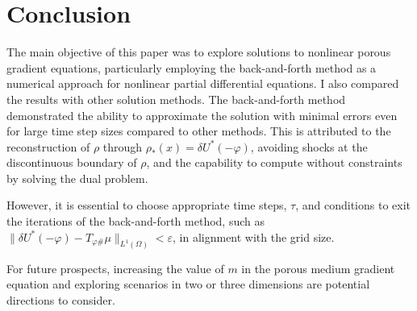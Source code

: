 \documentclass[a4,11pt, twocolumn, dvipdfmx]{article}
\theoremstyle{definition}
\begin{document}
\section{Conclusion}
The main objective of this paper was to explore solutions to nonlinear porous gradient equations, particularly employing the back-and-forth method as a numerical approach for nonlinear partial differential equations. 
I also compared the results with other solution methods.
The back-and-forth method demonstrated the ability to approximate the solution with minimal errors even for large time step sizes compared to other methods. 
This is attributed to the reconstruction of \(\rho\) through \(\rho_*(x) = \delta U^*(- \varphi)\), avoiding shocks at the discontinuous boundary of \(\rho\), and the capability to compute without constraints by solving the dual problem.

However, it is essential to choose appropriate time steps, $\tau$, and conditions to exit the iterations of the back-and-forth method, such as $\|\delta U^*(- \varphi) - T_{\varphi \#} \mu \|_{L^1(\Omega)} < \varepsilon$, in alignment with the grid size.

For future prospects, increasing the value of $m$ in the porous medium gradient equation and exploring scenarios in two or three dimensions are potential directions to consider.

\end{document}
